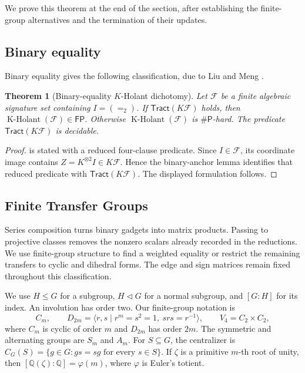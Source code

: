 \documentclass[11pt,letterpaper,onecolumn]{article}
\theoremstyle{plain}
\newtheorem{theorem}{Theorem}[section]
\theoremstyle{definition}
\theoremstyle{remark}
\newcommand{\cF}{\mathcal F}
\newcommand{\KHolant}{\operatorname{K\text{-}Holant}}
\newcommand{\Tract}{\mathsf{Tract}}
\newcommand{\FP}{\mathsf{FP}}
\newcommand{\SharpP}{\#\mathsf P}
\newcommand{\Eq}{=}
\begin{document}
	We prove this theorem at the end of the section, after establishing the
	finite-group alternatives and the termination of their updates.  
	
	\subsection{Binary equality}
	\label{subsec:equality-quaternary-interfaces}
	
    Binary equality gives the following classification, due to
    Liu and Meng \cite{Liu2026DEQ2Holant}.
	
	\begin{theorem}[Binary-equality \(K\)-Holant dichotomy]
		\label{thm:eq2-kholant-dichotomy}
		Let \(\cF\) be a finite algebraic signature set containing
		\(I=(\Eq_2)\).  If \(\Tract(K\cF)\) holds, then
		\(\KHolant(\cF)\in\FP\). Otherwise
		\(\KHolant(\cF)\) is \(\SharpP\)-hard.
		The predicate \(\Tract(K\cF)\) is decidable.
	\end{theorem}
	
	\begin{proof}
		\cite[Theorem~1.2]{Liu2026DEQ2Holant} is stated with a reduced four-clause
		predicate.
		Since \(I\in\cF\), its coordinate image contains
		\(Z=K^{\otimes2}I\in K\cF\). Hence the binary-anchor lemma
		\cite[Lemma~2.13]{Liu2026DEQ2Holant} identifies that reduced predicate with
		\(\Tract(K\cF)\).  The displayed formulation follows.
	\end{proof}
	
	\subsection{Finite Transfer Groups}
\label{subsec:finite-transfer-groups}

Series composition turns binary gadgets into matrix products. Passing to
projective classes removes the nonzero scalars already recorded in the
reductions. We use finite-group structure to find a weighted equality or
restrict the remaining transfers to cyclic and dihedral forms. The edge
and sign matrices remain fixed throughout this classification.

We use \(H\le G\) for a subgroup, \(H\triangleleft G\) for a normal
	subgroup, and \([G:H]\) for its index.  An involution has order two.
	Our finite-group notation is
	\[
	C_m,\qquad
	D_{2m}=\langle r,s\mid r^m=s^2=1,\ srs=r^{-1}\rangle,\qquad
	V_4=C_2\times C_2,
	\]
	where \(C_m\) is cyclic of order \(m\) and \(D_{2m}\) has order \(2m\).
	The symmetric and alternating groups are \(S_m\) and \(A_m\).
	For \(S\subseteq G\), the centralizer is
    \(C_G(S)=\{g\in G:gs=sg\text{ for every }s\in S\}\).
    If \(\zeta\) is a primitive \(m\)-th root of unity,
	then \([\mathbb Q(\zeta):\mathbb Q]=\varphi(m)\), where \(\varphi\) is
	Euler's totient.
	
\end{document}
